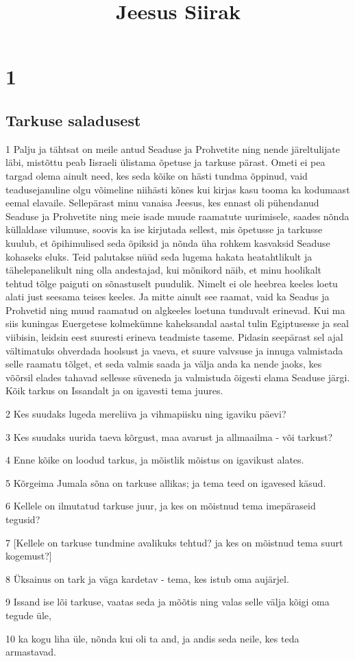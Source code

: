 

\title{Jeesus Siirak}

\chapter{1}

\section*{Tarkuse saladusest}

\par 1 Palju ja tähtsat on meile antud Seaduse ja Prohvetite ning nende järeltulijate läbi, mistõttu peab Iisraeli ülistama õpetuse ja tarkuse pärast. Ometi ei pea targad olema ainult need, kes seda kõike on hästi tundma õppinud, vaid teadusejanuline olgu võimeline niihästi kõnes kui kirjas kasu tooma ka kodumaast eemal elavaile. Sellepärast minu vanaisa Jeesus, kes ennast oli pühendanud Seaduse ja Prohvetite ning meie isade muude raamatute uurimisele, saades nõnda küllaldase vilumuse, soovis ka ise kirjutada sellest, mis õpetusse ja tarkusse kuulub, et õpihimulised seda õpiksid ja nõnda üha rohkem kasvaksid Seaduse kohaseks eluks. Teid palutakse nüüd seda lugema hakata heatahtlikult ja tähelepanelikult ning olla andestajad, kui mõnikord näib, et minu hoolikalt tehtud tõlge paiguti on sõnastuselt puudulik. Nimelt ei ole heebrea keeles loetu alati just seesama teises keeles. Ja mitte ainult see raamat, vaid ka Seadus ja Prohvetid ning muud raamatud on algkeeles loetuna tunduvalt erinevad. Kui ma siis kuningas Euergetese kolmekümne kaheksandal aastal tulin Egiptusesse ja seal viibisin, leidsin eest suuresti erineva teadmiste taseme. Pidasin seepärast sel ajal vältimatuks ohverdada hoolsust ja vaeva, et suure valvsuse ja innuga valmistada selle raamatu tõlget, et seda valmis saada ja välja anda ka nende jaoks, kes võõrsil elades tahavad sellesse süveneda ja valmistuda õigesti elama Seaduse järgi. Kõik tarkus on Issandalt ja on igavesti tema juures.
\par 2 Kes suudaks lugeda mereliiva ja vihmapiisku ning igaviku päevi?
\par 3 Kes suudaks uurida taeva kõrgust, maa avarust ja allmaailma - või tarkust?
\par 4 Enne kõike on loodud tarkus, ja mõistlik mõistus on igavikust alates.
\par 5 Kõrgeima Jumala sõna on tarkuse allikas; ja tema teed on igavesed käsud.
\par 6 Kellele on ilmutatud tarkuse juur, ja kes on mõistnud tema imepäraseid tegusid?
\par 7 [Kellele on tarkuse tundmine avalikuks tehtud? ja kes on mõistnud tema suurt kogemust?]
\par 8 Üksainus on tark ja väga kardetav - tema, kes istub oma aujärjel.
\par 9 Issand ise lõi tarkuse, vaatas seda ja mõõtis ning valas selle välja kõigi oma tegude üle,
\par 10 ka kogu liha üle, nõnda kui oli ta and, ja andis seda neile, kes teda armastavad.

